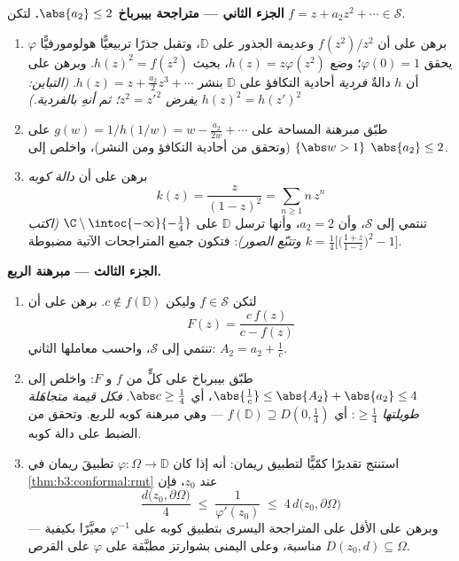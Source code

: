 \begin{problem}
\medskip
\noindent\textbf{الجزء الثاني --- متراجحة بيبرباخ $\abs{a_2} \leq
2$.}
لتكن $f = z + a_2z^2 + \cdots \in \mathcal S$.
\begin{enumerate}[resume]
  \item برهن على أن $f(z^2)/z^2$  وعديمة الجذور على
        $\mathbb D$، وتقبل جذرًا تربيعيًّا هولومورفيًّا
        $\varphi$ يحقق $\varphi(0) = 1$؛ وضع $h(z) =
        z\varphi(z^2)$، بحيث
        $h(z)^2 = f(z^2)$. وبرهن على أن $h$ دالةٌ \emph{فردية} أحادية
        التكافؤ على $\mathbb
        D$ بنشر $h(z) = z + \frac{a_2}2z^3 +
        \cdots$. \emph{(التباين:
        $h(z)^2 = h(z')^2$ يفرض $z^2 = z'^2$؛ ثم أنهِ بالفردية.)}
  \item طبّق مبرهنة المساحة على $g(w) = 1/h(1/w) = w -
        \frac{a_2}{2w} + \cdots$ على $\{\abs w > 1\}$
        (وتحقق من أحادية التكافؤ ومن النشر)، واخلص إلى $\abs{a_2} \leq 2$.
  \item برهن على أن \emph{دالة كوبه}
        \[
        k(z) = \frac{z}{(1 - z)^2} = \sum_{n\geq1}n\,z^n
        \]
        تنتمي إلى $\mathcal S$، وأن $a_2 = 2$، وأنها ترسل
        $\mathbb D$ على $\C\setminus\intoc{-\infty}{-\frac14}$ \emph{(اكتب $k = \frac14\bigl[\bigl(\frac{1+z}{1 -
        z}\bigr)^2 - 1\bigr]$ وتتبّع
        الصور)}: فتكون جميع المتراجحات الآتية مضبوطة.
\end{enumerate}

\medskip
\noindent\textbf{الجزء الثالث --- مبرهنة الربع.}
\begin{enumerate}[resume]
  \item لتكن $f \in \mathcal S$ وليكن $c \notin f(\mathbb D)$. برهن على أن
        \[
        F(z) = \frac{c\,f(z)}{c - f(z)}
        \]
        تنتمي إلى $\mathcal S$، واحسب معاملها الثاني: $A_2 = a_2 + \frac1c$.
  \item طبّق بيبرباخ على كلٍّ من $f$ و $F$: واخلص إلى $\abs{\frac1c} \leq \abs{A_2} + \abs{a_2} \leq 4$،
        أي $\abs c \geq \frac14$. \emph{فكل قيمة متجاهَلة طويلتها
        $\geq \frac14$}: أي $f(\mathbb D) \supseteq
        D(0, \frac14)$ --- وهي مبرهنة كوبه
        للربع. وتحقق من الضبط على دالة كوبه.
  \item استنتج تقديرًا كمّيًّا لتطبيق ريمان: أنه إذا كان
        $\varphi \colon \Omega \to \mathbb D$ تطبيقَ ريمان في \cref{thm:b3:conformal:rmt} عند $z_0$، فإن
        \[
        \frac{d\bigl(z_0, \partial\Omega\bigr)}{4}
        \;\leq\; \frac1{\varphi'(z_0)} \;\leq\;
        4\,d\bigl(z_0, \partial\Omega\bigr)
        \]
        --- وبرهن على الأقل على المتراجحة اليسرى بتطبيق كوبه
        على $\varphi^{-1}$ معيَّرًا بكيفية مناسبة، وعلى اليمنى
        بشوارتز مطبَّقة على $\varphi$ على القرص $D(z_0, d) \subseteq \Omega$.
\end{enumerate}


\end{problem}
